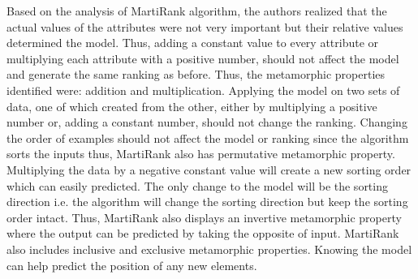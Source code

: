 Based on the analysis of MartiRank algorithm, the authors realized that the actual values of the attributes were not very important but their relative values determined the model. Thus, adding a constant value to every attribute or multiplying each attribute with a positive number, should not affect the model and generate the same ranking as before. Thus, the metamorphic properties identified were: addition and multiplication. Applying the model on two sets of data, one of which created from the other, either by multiplying a positive number or, adding a constant number, should not change the ranking. Changing the order of examples should not affect the model or ranking since the algorithm sorts the inputs thus, MartiRank also has permutative metamorphic property. Multiplying the data by a negative constant value will create a new sorting order which can easily predicted. The only change to the model will be the sorting direction i.e. the algorithm will change the sorting direction but keep the sorting order intact. Thus, MartiRank also displays an invertive metamorphic property where the output can be predicted by taking the opposite of input. MartiRank also includes inclusive and exclusive metamorphic properties. Knowing the model can help predict the position of any new elements.

